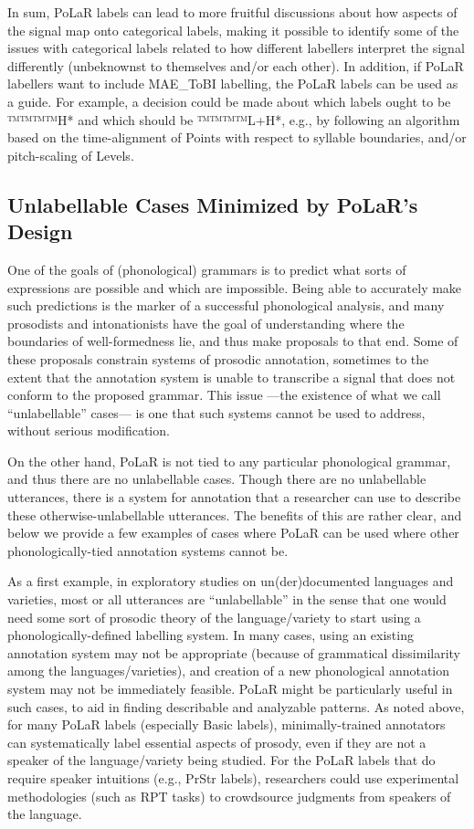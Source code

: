 \documentclass[11pt, twoside]{memoir}
\begin{document}
In sum, PoLaR labels can lead to more fruitful discussions about how aspects of the signal map onto categorical labels, making it possible to identify some of the issues with categorical labels related to how different labellers interpret the signal differently (unbeknownst to themselves and/or each other). In addition, if PoLaR labellers want to include MAE\_ToBI labelling, the PoLaR labels can be used as a guide.  For example, a decision could be made about which labels ought to be ™™™™{H*} and which should be ™™™™{L+H*}, e.g., by following an algorithm based on the time-alignment of Points with respect to syllable boundaries, and/or pitch-scaling of Levels.


\subsection{Unlabellable Cases Minimized by PoLaR’s Design}\label{sec:difficultunlabellable-cases}
One of the goals of (phonological) grammars is to predict what sorts of expressions are possible and which are impossible. Being able to accurately make such predictions is the marker of a successful phonological analysis, and many prosodists and intonationists have the goal of understanding where the boundaries of well-formedness lie, and thus make proposals to that end. Some of these proposals constrain systems of prosodic annotation, sometimes to the extent that the annotation system is unable to transcribe a signal that does not conform to the proposed grammar. This issue —the existence of what we call “unlabellable” cases— is one that such systems cannot be used to address, without serious modification.

On the other hand, PoLaR is not tied to any particular phonological grammar, and thus there are no unlabellable cases. Though there are no unlabellable utterances, there is a system for annotation that a researcher can use to describe these otherwise-unlabellable utterances. The benefits of this are rather clear, and below we provide a few examples of cases where PoLaR can be used where other phonologically-tied annotation systems cannot be.

As a first example, in exploratory studies on un(der)documented languages and varieties, most or all utterances are “unlabellable” in the sense that one would need some sort of prosodic theory of the language\slash variety to start using a phonologically-defined labelling system. In many cases, using an existing annotation system may not be appropriate (because of grammatical dissimilarity among the languages\slash varieties), and creation of a new phonological annotation system may not be immediately feasible. PoLaR might be particularly useful in such cases, to aid in finding describable and analyzable patterns. As noted above, for many PoLaR labels (especially Basic labels), minimally-trained annotators can systematically label essential aspects of prosody, even if they are not a speaker of the language\slash variety being studied. For the PoLaR labels that do require speaker intuitions (e.g., PrStr labels), researchers could use experimental methodologies (such as RPT tasks) to crowdsource judgments from speakers of the language.
\end{document}

